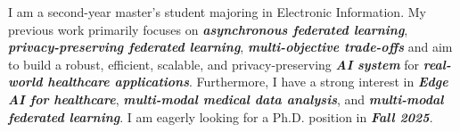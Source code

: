 

\begin{cvparagraph}


I am a second-year master's student majoring in Electronic Information.
My previous work primarily focuses on \textit{\textbf{asynchronous federated learning}}, \textit{\textbf{privacy-preserving federated learning}}, \textit{\textbf{multi-objective trade-offs}}
and aim to build a robust, efficient, scalable, and privacy-preserving \textit{\textbf{AI system}} for \textit{\textbf{real-world healthcare applications}}.
Furthermore, I have a strong interest in \textit{\textbf{Edge AI for healthcare}}, \textit{\textbf{multi-modal medical data analysis}}, and \textit{\textbf{multi-modal federated learning}}.
I am eagerly looking for a Ph.D. position in \textit{\textbf{Fall 2025}}.


\end{cvparagraph}
